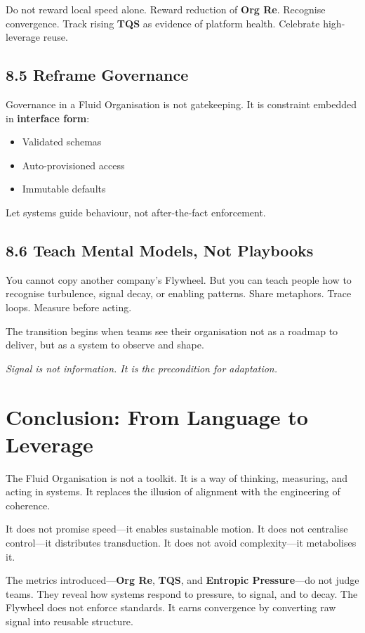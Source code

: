 \documentclass[12pt]{article}
\newenvironment{pullquote}
  {\begin{quoting}[leftmargin=2em,rightmargin=2em]\itshape}
  {\end{quoting}}
\begin{document}
Do not reward local speed alone. Reward reduction of \textbf{Org Re}. Recognise convergence. Track rising \textbf{TQS} as evidence of platform health. Celebrate high-leverage reuse.

\subsection*{8.5 Reframe Governance}

Governance in a Fluid Organisation is not gatekeeping. It is constraint embedded in \textbf{interface form}:
\begin{itemize}
    \item Validated schemas
    \item Auto-provisioned access
    \item Immutable defaults
\end{itemize}

Let systems guide behaviour, not after-the-fact enforcement.

\subsection*{8.6 Teach Mental Models, Not Playbooks}

You cannot copy another company’s Flywheel. But you can teach people how to recognise turbulence, signal decay, or enabling patterns. Share metaphors. Trace loops. Measure before acting.

The transition begins when teams see their organisation not as a roadmap to deliver, but as a system to observe and shape.

\begin{pullquote}
Signal is not information. It is the precondition for adaptation.
\end{pullquote}

\section{Conclusion: From Language to Leverage}

The Fluid Organisation is not a toolkit. It is a way of thinking, measuring, and acting in systems. It replaces the illusion of alignment with the engineering of coherence.

It does not promise speed—it enables sustainable motion. It does not centralise control—it distributes transduction. It does not avoid complexity—it metabolises it.

The metrics introduced—\textbf{Org Re}, \textbf{TQS}, and \textbf{Entropic Pressure}—do not judge teams. They reveal how systems respond to pressure, to signal, and to decay. The Flywheel does not enforce standards. It earns convergence by converting raw signal into reusable structure.
\end{document}
